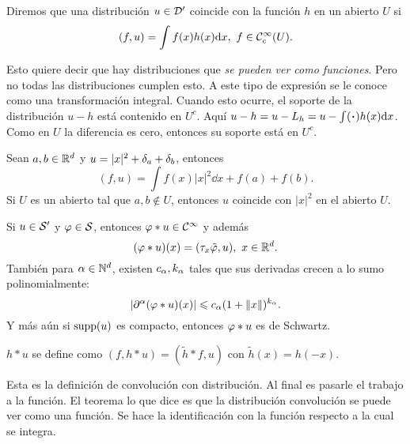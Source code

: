\documentclass[12pt]{memoir}
\begin{document}
\begin{Def}
  Diremos que una distribución $u\in\mathcal{D}'$ coincide con la función $h$ en un abierto $U$ si 
  $$(f,u)=\int f(x)h(x)\dd x,\ f\in\Coo_c(U).$$
\end{Def}

Esto quiere decir que hay distribuciones que \emph{se pueden ver como funciones}. Pero no todas las distribuciones cumplen esto. A este tipo de expresión se le conoce como una transformación integral. Cuando esto ocurre, el soporte de la distribución $u-h$ está contenido en $U^c$. Aquí $u-h=u-L_h=u-\int(\.)h(x)\dd x$. Como en $U$ la diferencia es cero, entonces su soporte está en $U^c$.

\begin{Ex}
  Sean $a,b\in\mathbb{R}^d$ y $u=|x|^2+\delta_a+\delta_b$, entonces 
  $$(f,u)=\int f(x)|x|^2\dd x+f(a)+f(b).$$
  Si $U$ es un abierto tal que $a,b\not\in U$, entonces $u$ coincide con $|x|^2$ en el abierto $U$.
\end{Ex}

\begin{Th}
  Si $u\in\mathcal{S}'$ y $\varphi\in\mathcal{S}$, entonces $\varphi\ast u\in\mathcal{C}^\infty$ y además 
  $$(\vf\ast u)(x)=(\tau_x\tilde{\vf},u),\ x\in\bR^d.$$
  También para $\alpha\in\mathbb{N}^d$, existen $c_\alpha,k_\alpha$ tales que sus derivadas crecen a lo sumo polinomialmente:
  $$|\partial^\alpha(\varphi\ast u)(x)|\leqslant c_\alpha(1+\left\|x\right\|)^{k_\alpha}.$$
  Y más aún si $\operatorname{supp}(u)$ es compacto, entonces $\varphi\ast u$ es de Schwartz.
\end{Th}

\begin{Def}
  $h\ast u$ se define como $(f,h\ast u)=(\tilde{h}\ast f,u)$ con $\tilde{h}(x)=h(-x)$.
\end{Def}

Esta es la definición de convolución con distribución. Al final es pasarle el trabajo a la función. El teorema lo que dice es que la distribución convolución se puede ver como una función. Se hace la identificación con la función respecto a la cual se integra. 
\end{document}
